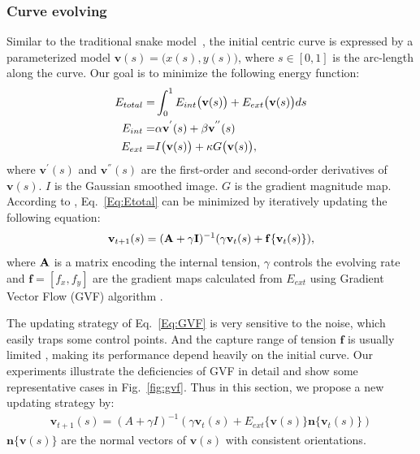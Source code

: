 \subsubsection{Curve evolving}
\label{sec:curve_evolving}


Similar to the traditional snake model~\cite{Kass1988}, the initial centric curve is expressed by a parameterized model $\mathbf{v}(s)=\big(x(s),y(s)\big)$, where $s\in[0,1]$ is the arc-length along the curve.
Our goal is to minimize the following energy function:
\begin{eqnarray}\label{Eq:Etotal}
E_{total} =&\int_{0}^{1} E_{int}\big( \mathbf{v}(s) \big)+ E_{ext}\big( \mathbf{v}(s)\big) ds \\
E_{int} = & \alpha\mathbf{v}^{'}(s)+\beta\mathbf{v}^{''}(s) \\\nonumber
E_{ext} =& I\big( \mathbf{v}(s)\big) + \kappa G\big(\mathbf{v}(s)\big),\nonumber
\end{eqnarray}
where $\mathbf{v}^{'}(s)$ and $\mathbf{v}^{''}(s)$ are the first-order and second-order derivatives of $\mathbf{v}(s)$.
$I$ is the Gaussian smoothed image.
$G$ is the gradient magnitude map.
According to \cite{Kass1988}, Eq.~\ref{Eq:Etotal} can be minimized by iteratively updating the following equation:
\begin{eqnarray}\label{Eq:GVF}
\mathbf{v}_{t+1}(s) = (\mathbf{A}+\gamma \mathbf{I})^{-1}(\gamma \mathbf{v}_t(s)+\mathbf{f}\{\mathbf{v}_t(s)\}),
\end{eqnarray}
where $\mathbf{A}$ is a matrix encoding the internal tension, $\gamma$ controls the evolving rate and $\mathbf{f}=[f_{x},f_{y}]$ are the gradient maps calculated from $E_{ext}$ using Gradient Vector Flow (GVF) algorithm \cite{Xu1998}.

The updating strategy of Eq.~\ref{Eq:GVF} is very sensitive to the noise, which easily traps some control points.
And the capture range of tension $\mathbf{f}$ is usually limited \cite{Cohen1991}, making its performance depend heavily on the initial curve.
Our experiments illustrate the deficiencies of GVF in detail and show some representative cases in Fig.~\ref{fig:gvf}.
Thus in this section, we propose a new updating strategy by:
\begin{eqnarray}\label{Eq:update}
\mathbf{v}_{t+1}(s) = (A+\gamma I)^{-1}(\gamma \mathbf{v}_t(s)+E_{ext}\{\mathbf{v}(s)\}\mathbf{n}\{\mathbf{v}_t(s)\})
\end{eqnarray}
$\mathbf{n}\{\mathbf{v}(s)\}$ are the normal vectors of $\mathbf{v}(s)$ with consistent orientations.


